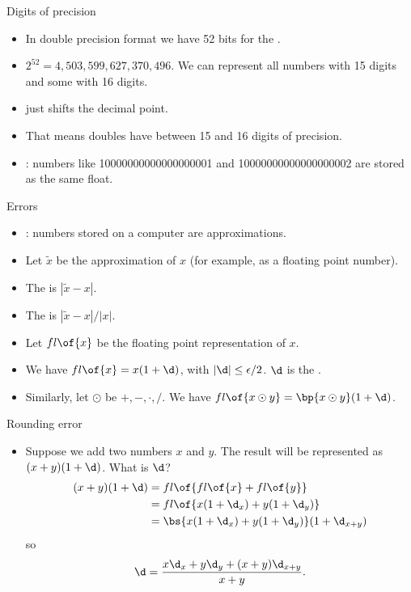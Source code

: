 \documentclass[11pt,xcolor={dvipsnames},aspectratio=159,hyperref={pdftex,pdfpagemode=UseNone,hidelinks,pdfdisplaydoctitle=true},usepdftitle=false]{beamer}
\begin{document}
\begin{frame}{Digits of precision}
    \begin{itemize}
    
        \item In double precision format we have 52 bits for the .
        \item $2^{52} = 4,503,599,627,370,496$. We can represent all numbers with 15 digits and some with 16 digits.
        \item {} just shifts the decimal point.
        \item That means doubles have between 15 and 16 digits of precision.
        \item {}: numbers like 10000000000000000001 and 10000000000000000002  are stored as the same float. 
    \end{itemize}
\end{frame}

\begin{frame}{Errors}
    \begin{itemize}
    
        \item {}: numbers stored on a computer are approximations.
        \item Let $\tilde{x}$ be the approximation of $x$ (for example, as a floating point number).
        \item The  is $|\tilde{x} - x|$.
        \item The  is $|\tilde{x} - x|\slash |x|$.
        \vspace{1cm}
        \item Let $fl\of{x}$ be the floating point representation of $x$.
        \item We have $fl\of{x} = x(1 + \d)$, with $|\d| \leq \epsilon \slash 2$. $\d$ is the .
        \item Similarly, let $\odot$ be $+,-,\cdot,/$. We have $fl\of{x\odot y} = \bp{x\odot y}(1 + \d)$.
    \end{itemize}
\end{frame}


\begin{frame}{Rounding error}
    \begin{itemize}
    
          \item Suppose we add two numbers $x$ and $y$. The result will be represented as $(x + y)(1 + \d)$. What is $\d$?
        \begin{align*}
             (x + y)(1 + \d) &= fl\of{fl\of{x}+fl\of{y}} \\
             & = fl\of{x(1 + \d_x) + y(1 + \d_y)} \\
                & = \bs{x(1 + \d_x) + y(1 + \d_y)} (1 + \d_{x+y}) 
        \end{align*} 
        so $$\d = \frac{x \d_x + y \d_y + (x+y)\d_{x+y}}{x+y}.$$
   \end{itemize}
\end{frame}
\end{document}
